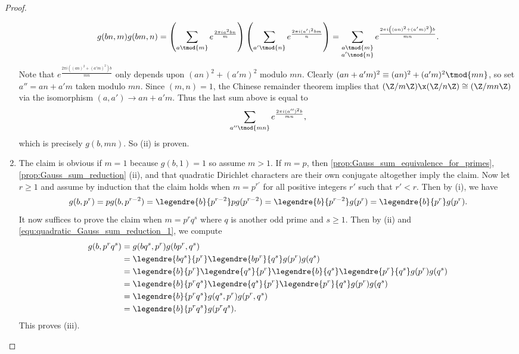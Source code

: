 \begin{proof}
\begin{enumerate}[label=(\roman*)]
              \[
                g(bn,m)g(bm,n) = \left(\sum_{a \tmod{m}}e^{\frac{2\pi ia^{2}bn}{m}}\right)\left(\sum_{a' \tmod{n}}e^{\frac{2\pi i(a')^{2}bm}{n}}\right) = \sum_{\substack{a \tmod{m} \\ a' \tmod{n}}}e^{\frac{2\pi i\left((an)^{2}+(a'm)^{2}\right)b}{mn}}.
              \]
              Note that $e^{\frac{2\pi i\left((an)^{2}+(a'm)^{2}\right)b}{mn}}$ only depends upon $(an)^{2}+(a'm)^{2}$ modulo $mn$. Clearly $(an+a'm)^{2} \equiv (an)^{2}+(a'm)^{2} \tmod{mn}$, so set $a'' = an+a'm$ taken modulo $mn$. Since $(m,n) = 1$, the Chinese remainder theorem implies that $(\Z/m\Z) \x (\Z/n\Z) \cong (\Z/mn\Z)$ via the isomorphism $(a,a') \to an+a'm$. Thus the last sum above is equal to
              \[
                \sum_{a'' \tmod{mn}}e^{\frac{2\pi i(a'')^{2}b}{mn}},
              \]
              which is precisely $g(b,mn)$. So (ii) is proven.
            \item The claim is obvious if $m = 1$ because $g(b,1) = 1$ so assume $m > 1$. If $m = p$, then \cref{prop:Gauss_sum_equivalence_for_primes}, \cref{prop:Gauss_sum_reduction} (ii), and that quadratic Dirichlet characters are their own conjugate altogether imply the claim. Now let $r \ge 1$ and assume by induction that the claim holds when $m = p^{r'}$ for all positive integers $r'$ such that $r' < r$. Then by (i), we have
            \begin{equation}\label{equ:quadratic_Gauss_sum_reduction_1}
              g(b,p^{r}) = pg(b,p^{r-2}) = \legendre{b}{p^{r-2}}pg(p^{r-2}) = \legendre{b}{p^{r-2}}g(p^{r}) = \legendre{b}{p^{r}}g(p^{r}).
            \end{equation}
            It now suffices to prove the claim when $m = p^{r}q^{s}$ where $q$ is another odd prime and $s \ge 1$. Then by (ii) and \cref{equ:quadratic_Gauss_sum_reduction_1}, we compute
            \begin{align*}
              g(b,p^{r}q^{s}) &= g(bq^{s},p^{r})g(bp^{r},q^{s}) \\
              &= \legendre{bq^{s}}{p^{r}}\legendre{bp^{r}}{q^{s}}g(p^{r})g(q^{s}) \\
              &= \legendre{b}{p^{r}}\legendre{q^{s}}{p^{r}}\legendre{b}{q^{s}}\legendre{p^{r}}{q^{s}}g(p^{r})g(q^{s}) \\
              &= \legendre{b}{p^{r}q^{s}}\legendre{q^{s}}{p^{r}}\legendre{p^{r}}{q^{s}}g(p^{r})g(q^{s}) \\
              &= \legendre{b}{p^{r}q^{s}}g(q^{s},p^{r})g(p^{r},q^{s}) \\
              &= \legendre{b}{p^{r}q^{s}}g(p^{r}q^{s}).
            \end{align*}
            This proves (iii).
          \end{enumerate}
        \end{proof}

